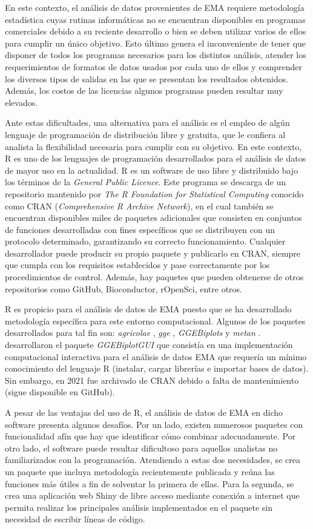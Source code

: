 En este contexto, el análisis de datos provenientes de EMA requiere metodología estadística cuyas rutinas informáticas no se encuentran disponibles en programas comerciales debido a su reciente desarrollo o bien se deben utilizar varios de ellos para cumplir un único objetivo. Esto último genera el inconveniente de tener que disponer de todos los programas necesarios para los distintos análisis, atender los requerimientos de formatos de datos usados por cada uno de ellos y comprender los diversos tipos de salidas en las que se presentan los resultados obtenidos. Además, los costos de las licencias algunos programas pueden resultar muy elevados. 

Ante estas dificultades, una alternativa para el análisis es el empleo de algún lenguaje de programación de distribución libre y gratuita, que le confiera al analista la flexibilidad necesaria para cumplir con su objetivo. En este contexto, R es uno de los lenguajes de programación desarrollados para el análisis de datos de mayor uso en la actualidad. R es un software de uso libre y distribuido bajo los términos de la \emph{General Public Licence}. Este programa se descarga de un repositorio mantenido por \emph{The R Foundation for Statistical Computing} conocido como CRAN (\emph{Comprehensive R Archive Network}), en el cual también se encuentran disponibles miles de paquetes adicionales que consisten en conjuntos de funciones desarrolladas con fines específicos que se distribuyen con un protocolo determinado, garantizando su correcto funcionamiento. Cualquier desarrollador puede producir su propio paquete y publicarlo en CRAN, siempre que cumpla con los requisitos establecidos y pase correctamente por los procedimientos de control. Además, hay paquetes que pueden obtenerse de otros repositorios como GitHub, Bioconductor, rOpenSci, entre otros. 

R es propicio para el análisis de datos de EMA puesto que se ha desarrollado metodología específica para este entorno computacional. Algunos de los paquetes desarrollados para tal fin son: \emph{agricolae} \citep{deMendiburu2020}, \emph{gge} \citep{WrightLaffont2021}, \emph{GGEBiplots} \citep{Dumble2017} y \emph{metan} \citep{Olivoto2020}. \citet{FrutosGalindoLeiva2013} desarrollaron el paquete \emph{GGEBiplotGUI} que consistía en una implementación computacional interactiva para el análisis de datos EMA que requería un mínimo conocimiento del lenguaje R (instalar, cargar librerías e importar bases de datos). Sin embargo, en 2021 fue archivado de CRAN debido a falta de mantenimiento (sigue disponible en GitHub).


A pesar de las ventajas del uso de R, el análisis de datos de EMA en dicho software presenta algunos desafíos. Por un lado, existen numerosos paquetes con funcionalidad afín que hay que identificar cómo combinar adecuadamente. Por otro lado, el software puede resultar dificultoso para aquellos analistas no familiarizados con la programación. Atendiendo a estas dos necesidades, se crea un paquete que incluya metodología recientemente publicada y reúna las funciones más útiles a fin de solventar la primera de ellas. Para la segunda, se crea una aplicación web Shiny de libre acceso mediante conexión a internet que permita realizar los principales análisis implementados en el paquete sin necesidad de escribir líneas de código. 
